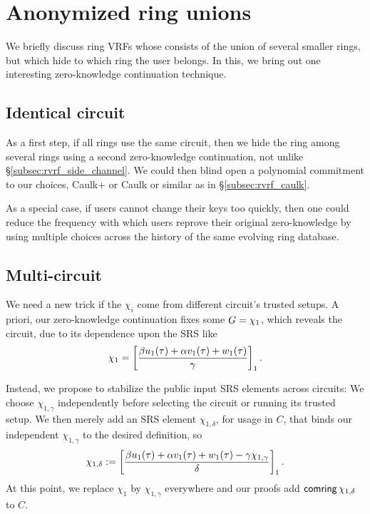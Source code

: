 \section{Anonymized ring unions}%
\label{sec:ring_hiding}

We briefly discuss ring VRFs whose \ring consists of the union of several
smaller rings, but which hide to which ring the user belongs.  In this,
we bring out one interesting zero-knowledge continuation technique.


\subsection{Identical circuit}

As a first step, if all rings use the same circuit, then we hide the
ring among several rings using a second zero-knowledge continuation,
not unlike \S\ref{subsec:rvrf_side_channel}.
We could then blind open a polynomial commitment \cite{KZG} to our
\comring choices, Caulk+ \cite{caulk+} or Caulk \cite{caulk} or similar
as in \S\ref{subsec:rvrf_caulk}.

As a special case, if users cannot change their keys too quickly, then
one could reduce the frequency with which users reprove their original
zero-knowledge by using multiple \comring choices across the history
of the same evolving ring database.



\subsection{Multi-circuit}

We need a new trick if the $\chi_i$ come from different circuit's
trusted setups.  A priori, our zero-knowledge continuation \pifast
fixes some $G = \chi_1$, which reveals the circuit,
due to its dependence upon the SRS like
$$ \chi_1 = \left[ {\beta u_1(\tau) + \alpha v_1(\tau) + w_1(\tau) \over \gamma} \right]_1 . $$

Instead, we propose to stabilize the public input SRS elements across circuits:
We choose $\chi_{1,\gamma}$ independently before selecting the circuit
or running its trusted setup.
We then merely add an SRS element $\chi_{1,\delta}$, for usage in $C$, that binds
our independent $\chi_{1,\gamma}$ to the desired definition, so
$$ \chi_{1,\delta} := \left[ {\beta u_1(\tau) + \alpha v_1(\tau) + w_1(\tau) - \gamma \chi_{1,\gamma} \over \delta} \right]_1 . $$
At this point, we replace $\chi_1$ by $\chi_{1,\gamma}$ everywhere and
our proofs add $\mathsf{comring} \, \chi_{1,\delta}$ to $C$.

